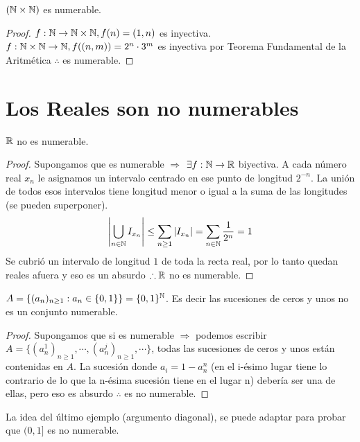 \begin{eg}
    $(\mathbb{N} \times \mathbb{N})$ es numerable.
    \begin{proof}
        $f: \mathbb{N} \to \mathbb{N}\times \mathbb{N}, f(n)=(1, n)$ es inyectiva.
        $f: \mathbb{N}\times \mathbb{N} \to \mathbb{N} , f((n, m))= 2^n \cdot 3^m$ es inyectiva por Teorema Fundamental de la Aritmética $\therefore$ es numerable.
    \end{proof}
\end{eg}

\section{Los Reales son no numerables}

\begin{theorem}
    $\mathbb{R}$  no es numerable.
    \begin{proof}
        Supongamos que es numerable $\Rightarrow$
        $\exists f: \mathbb{N} \to \mathbb{R}$ biyectiva. A cada número real $x_n$ le asignamos un intervalo centrado en ese punto de longitud $2^{-n}$. La unión de todos esos intervalos tiene longitud menor o igual a la suma de las longitudes (se pueden superponer).
        \begin{align*}
            \left|\bigcup_{n \in \mathbb{N}} I_{x_n}\right| \leq \sum_{n \geq 1} |I_{x_n}| = \sum_{n \in \mathbb{N}}\dfrac{1}{2^n} = 1
        \end{align*}
        Se cubrió un intervalo de longitud $1$ de toda la recta real, por lo tanto quedan reales afuera y eso es un absurdo $\therefore \mathbb{R}$ no es numerable.
    \end{proof}
\end{theorem}

\begin{eg}
    $A = \{ (a_n)_{n \geq 1} : a_n \in \{0, 1\}\} = \{0, 1\}^{\mathbb{N}}$. Es decir las sucesiones de ceros y unos no es un conjunto numerable.
    \begin{proof}
        Supongamos que si es numerable $\Rightarrow$ podemos escribir \\ $A = \{ (a_n^1)_{n\geq1}, \cdots, (a_n^j)_{n\geq1}, \cdots \}$, todas las sucesiones de ceros y unos están contenidas en $A$. La sucesión donde $a_i=1-a_n^n$ (en el i-ésimo lugar tiene lo contrario de lo que la n-ésima sucesión tiene en el lugar n) debería ser una de ellas, pero eso es absurdo $\therefore$ es no numerable.
    \end{proof}
\end{eg}

La idea del último ejemplo (argumento diagonal), se puede adaptar para probar que $(0, 1]$ es no numerable.

